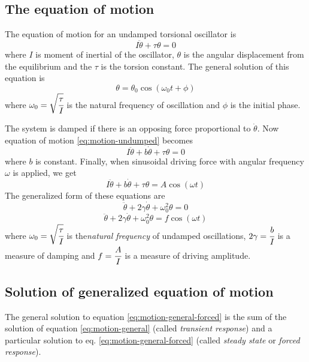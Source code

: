 \documentclass[12pt,a4paper]{article}
\begin{document}
	\subsection{The equation of motion}
	The equation of motion for an undamped torsional oscillator is
	\begin{equation} \label{eq:motion-undumped}
	I \ddot{\theta}+\tau \theta = 0
	\end{equation}
	where $I$ is moment of inertial of the oscillator, $\theta$ is the angular displacement from the equilibrium and the $\tau$ is the torsion constant. The general solution of this equation is
	\begin{equation} \label{eq:motion-undumped-sol}
	\theta = \theta_0 \cos(\omega_0 t + \phi) 
	\end{equation}
	where $\omega_0 = \sqrt{\cfrac{\tau}{I}}$ is the natural frequency of oscillation and $\phi$ is the initial phase.
	
	The system is damped if there is an opposing force proportional to $\dot{\theta}$. Now equation of motion \eqref{eq:motion-undumped} becomes
	\begin{equation} \label{eq:motion-dumped}
	I \ddot{\theta}+b\dot{\theta} + \tau \theta = 0
	\end{equation}
	where $b$ is constant. Finally, when sinusoidal driving force with angular frequency $\omega$ is applied, we get
	\begin{equation} \label{eq:motion-forced}
	I \ddot{\theta}+b\dot{\theta} + \tau \theta = A \cos(\omega t)
	\end{equation}
	The generalized form of these equations are
	\begin{equation} \label{eq:motion-general}
	\ddot{\theta}+2 \gamma \dot{\theta} + \omega_0^2 \theta = 0
	\end{equation}
	\begin{equation} \label{eq:motion-general-forced}
	\ddot{\theta}+2 \gamma \dot{\theta} + \omega_0^2 \theta = f \cos(\omega t)
	\end{equation}
	where $\omega_0 = \sqrt{\cfrac{\tau}{I}}$ is the\textit{natural frequency} of undamped oscillations, $2\gamma = \cfrac{b}{I}$ is a measure of damping and $f=\cfrac{A}{I}$ is a measure of driving amplitude.


	\subsection{Solution of generalized equation of motion}
	The general solution\cite{feynman-harmonic,feynman-transient} to equation \ref{eq:motion-general-forced} is the sum of the solution of equation \ref{eq:motion-general} (called \textit{transient response}) and a particular solution to eq. \ref{eq:motion-general-forced} (called \textit{steady state} or \textit{forced response}).
	
\end{document}
